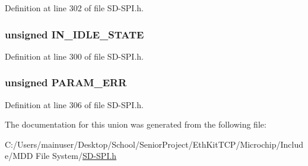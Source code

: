 Definition at line 302 of file S\+D-\/\+S\+P\+I.\+h.

\hypertarget{union_r_e_s_p_o_n_s_e__7_aacd57ecac9535b8bbec237cd7b8f1d5b}{}
\subsubsection[{I\+N\+\_\+\+I\+D\+L\+E\+\_\+\+S\+T\+A\+T\+E}]{\setlength{\rightskip}{0pt plus 5cm}unsigned I\+N\+\_\+\+I\+D\+L\+E\+\_\+\+S\+T\+A\+T\+E}\label{union_r_e_s_p_o_n_s_e__7_aacd57ecac9535b8bbec237cd7b8f1d5b}


Definition at line 300 of file S\+D-\/\+S\+P\+I.\+h.

\hypertarget{union_r_e_s_p_o_n_s_e__7_a22dcbf2add4c812de207ef9a507758e3}{}
\subsubsection[{P\+A\+R\+A\+M\+\_\+\+E\+R\+R}]{\setlength{\rightskip}{0pt plus 5cm}unsigned P\+A\+R\+A\+M\+\_\+\+E\+R\+R}\label{union_r_e_s_p_o_n_s_e__7_a22dcbf2add4c812de207ef9a507758e3}


Definition at line 306 of file S\+D-\/\+S\+P\+I.\+h.



The documentation for this union was generated from the following file\+:\begin{DoxyCompactItemize}
\item 
C\+:/\+Users/mainuser/\+Desktop/\+School/\+Senior\+Project/\+Eth\+Kit\+T\+C\+P/\+Microchip/\+Include/\+M\+D\+D File System/\hyperlink{_s_d-_s_p_i_8h}{S\+D-\/\+S\+P\+I.\+h}\end{DoxyCompactItemize}
